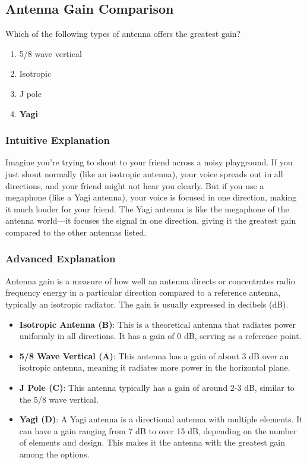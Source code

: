 \subsection{Antenna Gain Comparison}
\label{T9A06}

\begin{tcolorbox}[colback=gray!10!white,colframe=black!75!black,title=T9A06]
Which of the following types of antenna offers the greatest gain?
\begin{enumerate}[label=\Alph*)]
    \item 5/8 wave vertical
    \item Isotropic
    \item J pole
    \item \textbf{Yagi}
\end{enumerate}
\end{tcolorbox}

\subsubsection{Intuitive Explanation}
Imagine you’re trying to shout to your friend across a noisy playground. If you just shout normally (like an isotropic antenna), your voice spreads out in all directions, and your friend might not hear you clearly. But if you use a megaphone (like a Yagi antenna), your voice is focused in one direction, making it much louder for your friend. The Yagi antenna is like the megaphone of the antenna world—it focuses the signal in one direction, giving it the greatest gain compared to the other antennas listed.

\subsubsection{Advanced Explanation}
Antenna gain is a measure of how well an antenna directs or concentrates radio frequency energy in a particular direction compared to a reference antenna, typically an isotropic radiator. The gain is usually expressed in decibels (dB).

\begin{itemize}
    \item \textbf{Isotropic Antenna (B)}: This is a theoretical antenna that radiates power uniformly in all directions. It has a gain of 0 dB, serving as a reference point.
    \item \textbf{5/8 Wave Vertical (A)}: This antenna has a gain of about 3 dB over an isotropic antenna, meaning it radiates more power in the horizontal plane.
    \item \textbf{J Pole (C)}: This antenna typically has a gain of around 2-3 dB, similar to the 5/8 wave vertical.
    \item \textbf{Yagi (D)}: A Yagi antenna is a directional antenna with multiple elements. It can have a gain ranging from 7 dB to over 15 dB, depending on the number of elements and design. This makes it the antenna with the greatest gain among the options.
\end{itemize}


